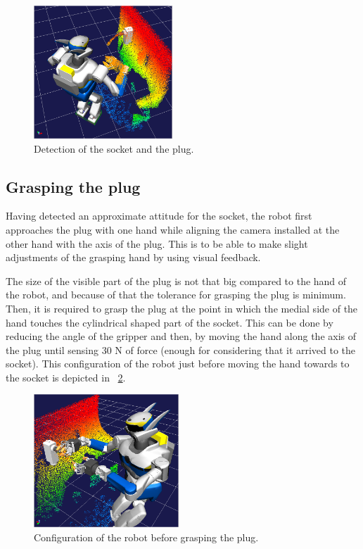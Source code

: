 		\begin{figure}[t]
			\centering
			\includegraphics[height = 5cm]{img/SocketPlugMarker}
			\caption{Detection of the socket and the plug.}
			\label{fig:SocketPlugMarker}
		\end{figure}
		
	\subsection{Grasping the plug}
		
		Having detected an approximate attitude for the socket, the robot first approaches the plug
		with one hand while aligning the camera installed at the other hand with the axis of the plug.
		This is to be able to make slight adjustments of the grasping hand by using visual feedback.
		
		The size of the visible part of the plug is not that big compared to the hand of the robot,
		and because of that the tolerance for	grasping the plug is minimum.
		Then, it is required to grasp the plug at the point in which the medial side of the hand
		touches the cylindrical shaped part of the socket.
		This can be done by reducing the angle of the gripper and then, by moving the hand along the
		axis of the plug until sensing 30 N of force (enough for considering that it arrived to the socket).
		This configuration of the robot just before moving the hand towards to the socket is depicted in
		\figurename~\ref{fig:PreCloseHand}.
		
		\begin{figure}[t]
			\centering
			\includegraphics[height = 5cm]{img/PreCloseHand}
			\caption{Configuration of the robot before grasping the plug.}
			\label{fig:PreCloseHand}
		\end{figure}
		
